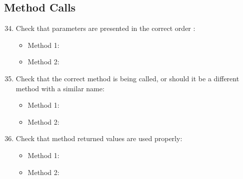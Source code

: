 \subsection{Method Calls}
\begin{enumerate}
	\setcounter{enumi}{33}
	\item Check that parameters are presented in the correct order :
	\begin{itemize}
		\item Method 1: \cmark
		\item Method 2:
	\end{itemize}
	\item Check that the correct method is being called, or should it be a different method with a similar name:
	\begin{itemize}
		\item Method 1: \cmark
		\item Method 2:
	\end{itemize}
	\item Check that method returned values are used properly:
	\begin{itemize}
		\item Method 1: \cmark
		\item Method 2: 
	\end{itemize}
\end{enumerate}